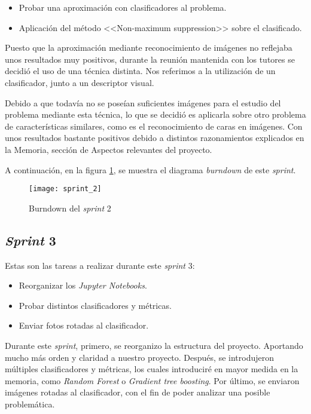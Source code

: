 \begin{itemize}
	\item Probar una aproximación con clasificadores al problema.
	\item Aplicación del método <<Non-maximum suppression>> sobre el clasificado.
\end{itemize}

Puesto que la aproximación mediante reconocimiento de imágenes no reflejaba unos resultados muy positivos, durante la reunión mantenida con los tutores se decidió el uso de una técnica distinta. Nos referimos a la utilización  de un clasificador, junto a un descriptor visual.

Debido a que todavía no se poseían suficientes imágenes para el estudio del problema mediante esta técnica, lo que se decidió es aplicarla sobre otro problema de características similares, como es el reconocimiento de caras en imágenes. Con unos resultados bastante positivos debido a distintos razonamientos explicados en la Memoria, sección de Aspectos relevantes del proyecto.

A continuación, en la figura \ref{fig:A.1.3}, se muestra el diagrama \textit{burndown} de este \textit{sprint}.

\begin{figure}
\centering
\texttt{[image: sprint\_2]}
\caption{Burndown del \textit{sprint} 2}
\label{fig:A.1.3}
\end{figure}

\subsection{\textit{Sprint} 3}
Estas son las tareas a realizar durante este \textit{sprint} 3:

\begin{itemize}
	\item Reorganizar los \textit{Jupyter Notebooks}.
	\item Probar distintos clasificadores y métricas.
	\item Enviar fotos rotadas al clasificador.
\end{itemize}

Durante este \textit{sprint}, primero, se reorganizo la estructura del proyecto. Aportando mucho más orden y claridad a nuestro proyecto. Después, se introdujeron múltiples clasificadores y métricas, los cuales introduciré en mayor medida en la memoria, como \textit{Random Forest}\cite{randomforest} o \textit{Gradient tree boosting}\cite{gradientboosting}. Por último, se enviaron imágenes rotadas al clasificador, con el fin de poder analizar una posible problemática.

